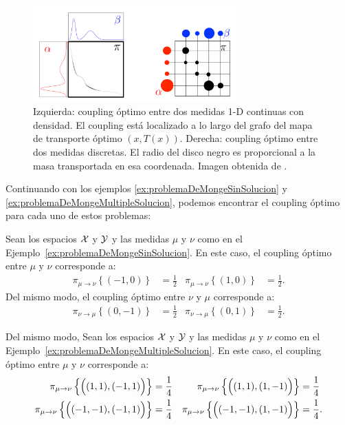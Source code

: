 \begin{figure}[H]
    \centering
    \includegraphics[width=0.7\textwidth]{img/transporte/coupling-example.png}
    \caption{Izquierda: coupling óptimo entre dos medidas 1-D continuas con densidad. El coupling está localizado a lo largo del grafo del mapa de transporte óptimo $(x, T(x))$. Derecha: coupling óptimo entre dos medidas discretas. El radio del disco negro es proporcional a la masa transportada en esa coordenada. Imagen obtenida de \cite{peyre2019computational}.
        \label{fig:coupling-example}}
\end{figure}

Continuando con los ejemplos \ref*{ex:problemaDeMongeSinSolucion} y \ref*{ex:problemaDeMongeMultipleSolucion}, podemos encontrar el coupling óptimo para cada uno de estos problemas:

\begin{example}
    Sean los espacios $\mathcal{X}$ y $\mathcal{Y}$ y las medidas $\mu$ y $\nu$ como en el Ejemplo~\ref*{ex:problemaDeMongeSinSolucion}. En este caso, el coupling óptimo entre $\mu$ y $\nu$ corresponde a:
    \begin{align*}
        \pi_{\mu \to \nu}\left\{ (-1, 0) \right\} & = \frac{1}{2} & \pi_{\mu \to \nu}\left\{ (1, 0) \right\} & = \frac{1}{2}.
    \end{align*}
    Del mismo modo, el coupling óptimo entre $\nu$ y $\mu$ corresponde a:
    \begin{align*}
        \pi_{\nu \to \mu}\left\{ (0, -1) \right\} & = \frac{1}{2} & \pi_{\nu \to \mu}\left\{ (0, 1) \right\} & = \frac{1}{2}.
    \end{align*}

\end{example}

\begin{example}
    Del mismo modo, Sean los espacios $\mathcal{X}$ y $\mathcal{Y}$ y las medidas $\mu$ y $\nu$ como en el Ejemplo~\ref*{ex:problemaDeMongeMultipleSolucion}. En este caso, el coupling óptimo entre $\mu$ y $\nu$ corresponde a:
    \begin{align*}
        \pi_{\mu \to \nu}\left\{ \qty\Big((1, 1), (-1, 1)) \right\}   & = \frac{1}{4} & \pi_{\mu \to \nu}\left\{ \qty\Big((1, 1), (1, -1)) \right\}   & = \frac{1}{4}  \\
        \pi_{\mu \to \nu}\left\{ \qty\Big((-1, -1), (-1, 1)) \right\} & = \frac{1}{4} & \pi_{\mu \to \nu}\left\{ \qty\Big((-1, -1), (1, -1)) \right\} & = \frac{1}{4}.
    \end{align*}

\end{example}

